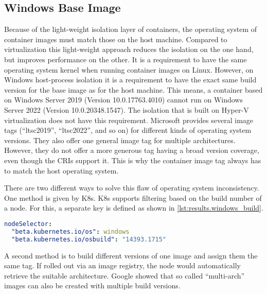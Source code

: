 \subsection{Windows Base Image}
Because of the light-weight isolation layer of containers, the operating system of container images must match those on the host machine. Compared to virtualization this light-weight approach reduces the isolation on the one hand, but improves performance on the other.
It is a requirement to have the same operating system kernel when running container images on Linux. However, on \ac{Windows} host-process isolation it is a requirement to have the exact same build version for the base image as for the host machine. This means, a container based on Windows Server 2019 (Version 10.0.17763.4010) cannot run on Windows Server 2022 (Version 10.0.20348.1547).
The isolation that is built on Hyper-V virtualization does not have this requirement. 
Microsoft provides several image tags (\enquote{ltsc2019}, \enquote{ltsc2022}, and so on) for different kinds of operating system versions\cite{MattbriggsMicrosoft.20230214,Microsoft.20230313}. They also offer one general image tag for multiple architectures\cite{Microsoft.20230313}. However, they do not offer a more generous tag having a broad version coverage, even though the \acp{CRI} support it. This is why the container image tag always has to match the host operating system.

There are two different ways to solve this flaw of operating system inconsistency. One method is given by \ac{K8s}. \ac{K8s} supports filtering based on the build number of a node\cite{Brasmithms.20230313}. For this, a separate  key is defined as shown in \autoref{lst:results.windows_build}.
\begin{lstlisting}[caption={\ac{K8s} manifest with node selector for specific Windows build.}, label=lst:results.windows_build, language=yaml]
nodeSelector:
  "beta.kubernetes.io/os": windows
  "beta.kubernetes.io/osbuild": "14393.1715"
\end{lstlisting}
A second method is to build different versions of one image and assign them the same tag. If rolled out via an image registry, the node would automatically retrieve the suitable architecture. Google showed that so called \enquote{multi-arch} images can also be created with multiple build versions\cite{Google.20230313}.


